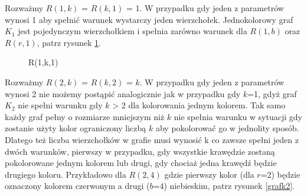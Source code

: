 
 Rozważmy $R(1,k)$ = $R(k,1)$ = 1.  W przypadku gdy jeden z parametrów wynosi 1 aby spełnić warunek wystarczy jeden wierzchołek.  Jednokolorowy graf $\mathit{K}_{1}$ jest pojedynczym wierzchołkiem i spełnia zarówno warunek dla $R(1,b)$ oraz $R(r,1)$, patrz rysunek \ref{grafk1}. 
  
  \begin{figure}[h]
  \centering
   \caption{R(1,k,1)}
   \label{grafk1}
\end{figure}
  
  \hfill \par
	Rozważmy $R(2,k)$ = $R(k,2)$ = $k$. W przypadku gdy jeden z parametrów wynosi 2 nie możemy postąpić analogicznie jak w przypadku gdy $k$=1, gdyż graf $\mathit{K}_{2}$ nie spełni warunku gdy $k$ > 2 dla kolorowania jednym kolorem. Tak samo każdy graf pełny o rozmiarze mniejszym niż $k$ nie spełnia warunku w sytuacji gdy zostanie użyty kolor ograniczony liczbą $k$ aby pokolorować go w jednolity sposób. Dlatego też liczba wierzchołków w grafie musi wynosić k co zawsze spełni jeden z dwóch warunków, pierwszy w przypadku, gdy wszystkie krawędzie zostaną pokolorowane jednym kolorem lub drugi, gdy chociaż jedna krawędź będzie drugiego koloru. Przykładowo dla $R(2,4)$ gdzie pierwszy kolor (dla $r$=2) będzie oznaczony kolorem czerwonym a drugi ($b$=4) niebieskim, patrz rysunek \ref{grafk2}.
	
